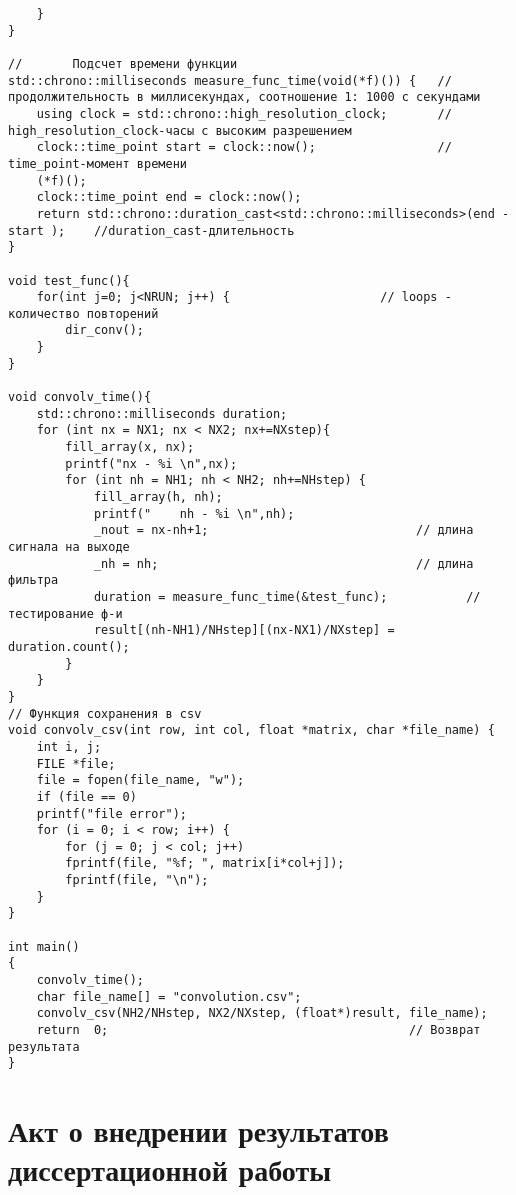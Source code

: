 \begin{verbatim}
	}
}

//       Подсчет времени функции
std::chrono::milliseconds measure_func_time(void(*f)()) {   // продолжительность в миллисекундах, соотношение 1: 1000 с секундами
	using clock = std::chrono::high_resolution_clock;       // high_resolution_clock-часы с высоким разрешением
	clock::time_point start = clock::now();                 // time_point-момент времени
	(*f)();
	clock::time_point end = clock::now();
	return std::chrono::duration_cast<std::chrono::milliseconds>(end - start );    //duration_cast-длительность
}

void test_func(){
	for(int j=0; j<NRUN; j++) {            			// loops - количество повторений
		dir_conv();
	}
}

void convolv_time(){
	std::chrono::milliseconds duration;
	for (int nx = NX1; nx < NX2; nx+=NXstep){
		fill_array(x, nx);
		printf("nx - %i \n",nx);
		for (int nh = NH1; nh < NH2; nh+=NHstep) {
			fill_array(h, nh);
			printf("    nh - %i \n",nh);
			_nout = nx-nh+1;                             // длина сигнала на выходе
			_nh = nh;                                    // длина фильтра
			duration = measure_func_time(&test_func);           // тестирование ф-и
			result[(nh-NH1)/NHstep][(nx-NX1)/NXstep] = duration.count();
		}
	}
}
// Функция сохранения в csv
void convolv_csv(int row, int col, float *matrix, char *file_name) {
	int i, j;
	FILE *file;
	file = fopen(file_name, "w");
	if (file == 0)
	printf("file error");
	for (i = 0; i < row; i++) {
		for (j = 0; j < col; j++)
		fprintf(file, "%f; ", matrix[i*col+j]);
		fprintf(file, "\n");
	}
}

int main()
{
	convolv_time();
	char file_name[] = "convolution.csv";
	convolv_csv(NH2/NHstep, NX2/NXstep, (float*)result, file_name);
	return  0;                                          // Возврат результата
}

\end{verbatim}




\chapter{Акт о внедрении результатов диссертационной работы}\label{app:Ж}

